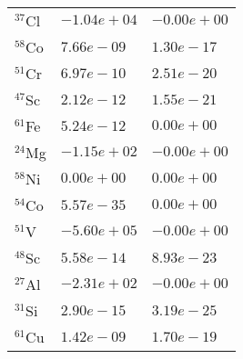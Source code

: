 \begin{tabular}{lll}
 $^{37}$Cl & $-1.04e+04 $                                                       & $-0.00e+00 $                                                                    \\
 $^{58}$Co & $7.66e-09 $                                                        & $1.30e-17 $                                                                     \\
 $^{51}$Cr & $6.97e-10 $                                                        & $2.51e-20 $                                                                     \\
 $^{47}$Sc & $2.12e-12 $                                                        & $1.55e-21 $                                                                     \\
 $^{61}$Fe & $5.24e-12 $                                                        & $0.00e+00 $                                                                     \\
 $^{24}$Mg & $-1.15e+02 $                                                       & $-0.00e+00 $                                                                    \\
 $^{58}$Ni & $0.00e+00 $                                                        & $0.00e+00 $                                                                     \\
 $^{54}$Co & $5.57e-35 $                                                        & $0.00e+00 $                                                                     \\
 $^{51}$V  & $-5.60e+05 $                                                       & $-0.00e+00 $                                                                    \\
 $^{48}$Sc & $5.58e-14 $                                                        & $8.93e-23 $                                                                     \\
 $^{27}$Al & $-2.31e+02 $                                                       & $-0.00e+00 $                                                                    \\
 $^{31}$Si & $2.90e-15 $                                                        & $3.19e-25 $                                                                     \\
 $^{61}$Cu & $1.42e-09 $                                                        & $1.70e-19 $                                                                     \\

\end{tabular}
